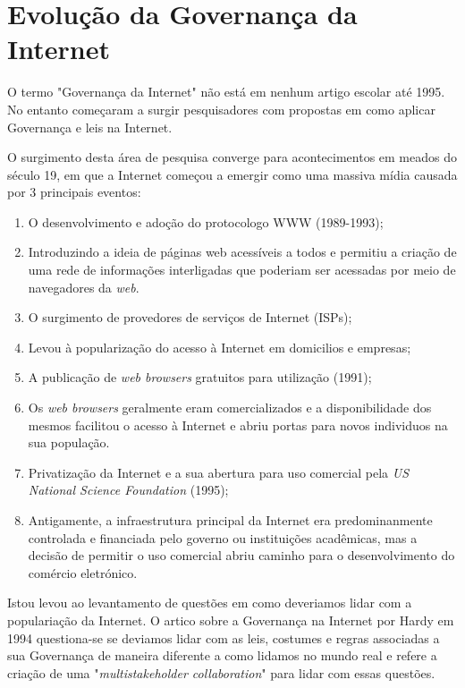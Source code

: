 \section{Evolução da Governança da Internet}
\label{sec:governanceevo}
O termo "Governança da Internet" não está em nenhum artigo escolar até 1995. No entanto começaram a surgir pesquisadores com propostas em como aplicar 
Governança e leis na Internet.

O surgimento desta área de pesquisa converge para acontecimentos em meados do século 19, 
em que a Internet começou a emergir como uma massiva mídia
causada por 3 principais eventos:

\begin{enumerate}
  \item O desenvolvimento e adoção do protocologo WWW (1989-1993);
  \item[] Introduzindo a ideia de páginas web acessíveis a todos e permitiu a criação 
de uma rede de informações interligadas que poderiam ser acessadas por meio de navegadores
da \textit{web}.
  
  \item O surgimento de provedores de serviços de Internet (ISPs);
  \item[] Levou à popularização do acesso à Internet em domicilios e empresas;

  \item A publicação de \textit{web browsers} gratuitos para utilização (1991);
  \item[]Os \textit{web browsers} geralmente eram comercializados e a disponibilidade 
dos mesmos facilitou o acesso à Internet e abriu portas para novos individuos na sua
população.

  \item Privatização da Internet e a sua abertura para uso comercial 
pela \textit{US National Science Foundation} (1995); 
  \item[]Antigamente, a infraestrutura principal da Internet era predominanmente 
controlada e financiada pelo governo ou instituições acadêmicas, mas a decisão de 
permitir o uso comercial abriu caminho para o desenvolvimento do comércio eletrónico.
\end{enumerate}

Istou levou ao levantamento de questões em como deveriamos lidar com a populariação da Internet.
O artico sobre a Governança na Internet por Hardy em 1994 questiona-se se deviamos lidar com 
as leis, costumes e regras associadas a sua Governança de maneira diferente a como lidamos 
no mundo real e refere a criação de uma "\textit{multistakeholder collaboration}" para lidar 
com essas questões.


